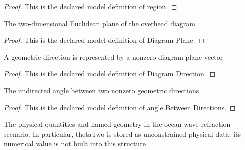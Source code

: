 \begin{proof}
  This is the declared model definition of region.
\end{proof}
\begin{definition}
  \label{def:physics:phyx-mini-0174:phyxminiproblems-problemphyxmini0174-diagramplane}
  The two-dimensional Euclidean plane of the overhead diagram
\end{definition}
\begin{proof}
  This is the declared model definition of Diagram Plane.
\end{proof}
\begin{definition}
  \label{def:physics:phyx-mini-0174:phyxminiproblems-problemphyxmini0174-diagramdirection}
  A geometric direction is represented by a nonzero diagram-plane vector
\end{definition}
\begin{proof}
  This is the declared model definition of Diagram Direction.
\end{proof}
\begin{definition}
  \label{def:physics:phyx-mini-0174:phyxminiproblems-problemphyxmini0174-anglebetweendirections}
  The undirected angle between two nonzero geometric directions
\end{definition}
\begin{proof}
  This is the declared model definition of angle Between Directions.
\end{proof}
\begin{definition}
  \label{def:physics:phyx-mini-0174:phyxminiproblems-problemphyxmini0174-oceanwaverefractionsetup}
  The physical quantities and named geometry in the ocean-wave refraction scenario. In particular, thetaTwo is stored as unconstrained physical data; its numerical value is not built into this structure
\end{definition}
